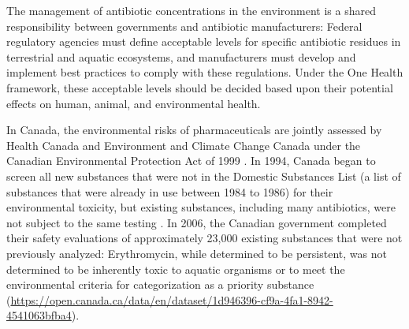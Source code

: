 The management of antibiotic concentrations in the environment is a shared responsibility between governments and antibiotic manufacturers:
Federal regulatory agencies must define acceptable levels for specific antibiotic residues in terrestrial and aquatic ecosystems, and manufacturers must develop and implement best practices to comply with these regulations.
Under the One Health framework, these acceptable levels should be decided based upon their potential effects on human, animal, and environmental health.

In Canada, the environmental risks of pharmaceuticals are jointly assessed by Health Canada and Environment and Climate Change Canada under the Canadian Environmental Protection Act of 1999 \parencite{Lee.2019}.
In 1994, Canada began to screen all new substances that were not in the Domestic Substances List (a list of substances that were already in use between 1984 to 1986) for their environmental toxicity, but existing substances, including many antibiotics, were not subject to the same testing \parencite{Lee.2019}.
In 2006, the Canadian government completed their safety evaluations of approximately 23,000 existing substances that were not previously analyzed:
Erythromycin, while determined to be persistent, was not determined to be inherently toxic to aquatic organisms or to meet the environmental criteria for categorization as a priority substance (\url{https://open.canada.ca/data/en/dataset/1d946396-cf9a-4fa1-8942-4541063bfba4}).



